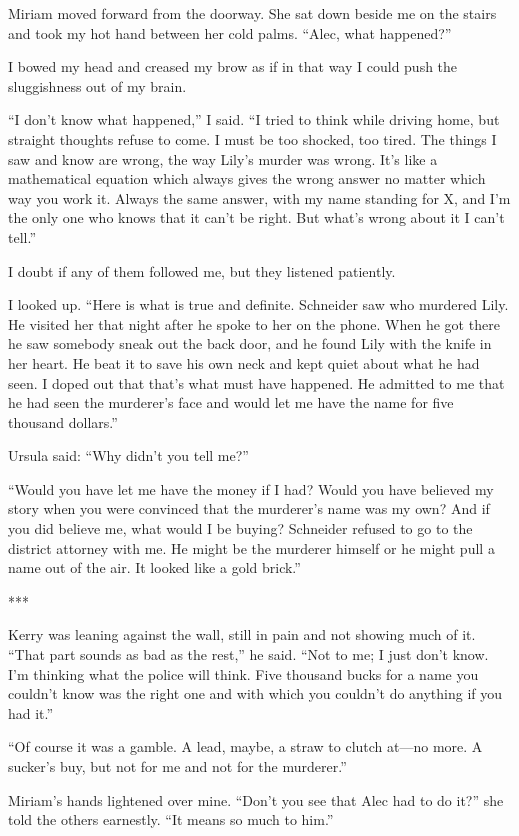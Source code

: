 \documentclass{novel}
\begin{document}
Miriam moved forward from the doorway. She sat down beside me on the stairs and took my hot hand between her cold palms. “Alec, what happened?”

I bowed my head and creased my brow as if in that way I could push the sluggishness out of my brain.

“I don’t know what happened,” I said. “I tried to think while driving home, but straight thoughts refuse to come. I must be too shocked, too tired. The things I saw and know are wrong, the way Lily’s murder was wrong. It’s like a mathematical equation which always gives the wrong answer no matter which way you work it. Always the same answer, with my name standing for X, and I’m the only one who knows that it can’t be right. But what’s wrong about it I can’t tell.”

I doubt if any of them followed me, but they listened patiently.

I looked up. “Here is what is true and definite. Schneider saw who murdered Lily. He visited her that night after he spoke to her on the phone. When he got there he saw somebody sneak out the back door, and he found Lily with the knife in her heart. He beat it to save his own neck and kept quiet about what he had seen. I doped out that that’s what must have happened. He admitted to me that he had seen the murderer’s face and would let me have the name for five thousand dollars.”

Ursula said: “Why didn’t you tell me?”

“Would you have let me have the money if I had? Would you have believed my story when you were convinced that the murderer’s name was my own? And if you did believe me, what would I be buying? Schneider refused to go to the district attorney with me. He might be the murderer himself or he might pull a name out of the air. It looked like a gold brick.”

***

Kerry was leaning against the wall, still in pain and not showing much of it. “That part sounds as bad as the rest,” he said. “Not to me; I just don’t know. I’m thinking what the police will think. Five thousand bucks for a name you couldn’t know was the right one and with which you couldn’t do anything if you had it.”

“Of course it was a gamble. A lead, maybe, a straw to clutch at—no more. A sucker’s buy, but not for me and not for the murderer.”

Miriam’s hands lightened over mine. “Don’t you see that Alec had to do it?” she told the others earnestly. “It means so much to him.”
\end{document}
